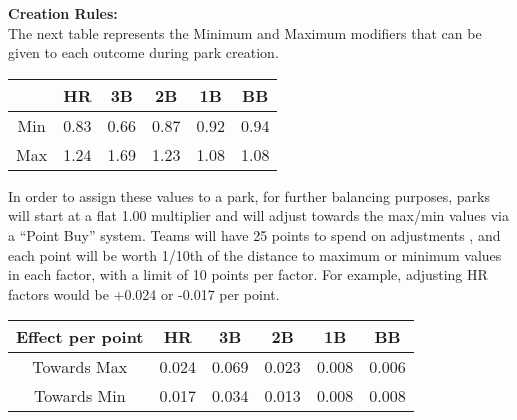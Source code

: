 \textbf{Creation Rules:}\\
The next table represents the Minimum and Maximum modifiers that can be given to each outcome during park creation.

\begin{center}
      \begin{tabular}{|c|c|c|c|c|c|}
	\hline
	& HR & 3B & 2B & 1B & BB \\
	\hline
	Min & 0.83 & 0.66 & 0.87 & 0.92 & 0.94 \\
	\hline
	Max & 1.24 & 1.69 & 1.23 & 1.08 & 1.08 \\
	\hline
     \end{tabular}
\end{center}

In order to assign these values to a park, for further balancing purposes, parks will start at a flat 1.00 multiplier and
 will adjust towards the max/min values via a “Point Buy” system. Teams will have 25 points to spend on adjustments
, and each point will be worth 1/10th of the distance to maximum or minimum values in each factor, with a limit of 10
 points per factor. For example, adjusting HR factors would be +0.024 or -0.017 per point.

\begin{center}
      \begin{tabular}{|c|c|c|c|c|c|}
	\hline
	Effect per point & HR & 3B & 2B & 1B & BB \\
	\hline
	Towards Max & 0.024 & 0.069 & 0.023 & 0.008 & 0.006 \\
	\hline
	Towards Min & 0.017 & 0.034 & 0.013 & 0.008 & 0.008 \\
	\hline
     \end{tabular}
\end{center}
